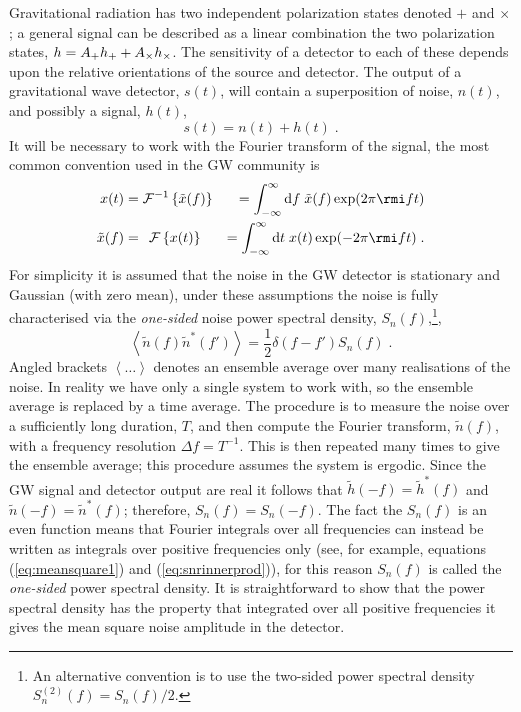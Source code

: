 Gravitational radiation has two independent polarization states denoted $+$ and $\times$; a general signal can be described as a linear combination the two polarization states, $h \nobreak=\nobreak A_{+} h_{+}\nobreak +\nobreak A_{\times} h_{\times}$. The sensitivity of a detector to each of these depends upon the relative orientations of the source and detector. The output of a gravitational wave detector, $s(t)$, will contain a superposition of noise, $n(t)$, and possibly a signal, $h(t)$,
\begin{equation} s(t)=n(t)+h(t) \; . \end{equation}
It will be necessary to work with the Fourier transform of the signal, the most common convention used in the GW community is
\begin{eqnarray} x(t)&={\cal{F}}^{-1}\left\{\tilde{x}(f)\right\}&=\int_{-\infty}^{\infty}\mathrm{d}f\;\tilde{x}(f)\exp (2\pi \rmi f t )  \nonumber \\
\tilde{x}(f) &=\,\;{\cal{F}}\left\{x(t)\right\}&=\int_{-\infty}^{\infty}\mathrm{d}t\;x(t)\exp (-2\pi \rmi f t )\; .\end{eqnarray}
For simplicity it is assumed that the noise in the GW detector is stationary and Gaussian (with zero mean), under these assumptions the noise is fully characterised via the \emph{one-sided} noise power spectral density, $S_{n}(f)$,\footnote{An alternative convention is to use the two-sided power spectral density $S^{(2)}_{n}(f)=S_{n}(f)/2$.}, 
\begin{equation}\label{eq:psd} \left<\tilde{n}(f)\tilde{n}^{*}(f')\right>=\frac{1}{2}\delta (f-f')S_{n}(f) \; .\end{equation}
Angled brackets $\left<\ldots\right>$ denotes an ensemble average over many realisations of the noise. In reality we have only a single system to work with, so the ensemble average is replaced by a time average. The procedure is to measure the noise over a sufficiently long duration, $T$, and then compute the Fourier transform, $\tilde{n}(f)$, with a frequency resolution $\Delta f = T^{-1}$. This is then repeated many times to give the ensemble average; this procedure assumes the system is ergodic. Since the GW signal and detector output are real it follows that $\tilde{h}(-f)=\tilde{h}^{*}(f)$ and $\tilde{n}(-f)=\tilde{n}^{*}(f)$; therefore, $S_{n}(f)=S_{n}(-f)$. The fact the $S_{n}(f)$ is an even function means that Fourier integrals over all frequencies can instead be written as integrals over positive frequencies only (see, for example, equations (\ref{eq:meansquare1}) and (\ref{eq:snrinnerprod})), for this reason $S_{n}(f)$ is called the \emph{one-sided} power spectral density. It is straightforward to show that the power spectral density has the property that integrated over all positive frequencies it gives the mean square noise amplitude in the detector.
